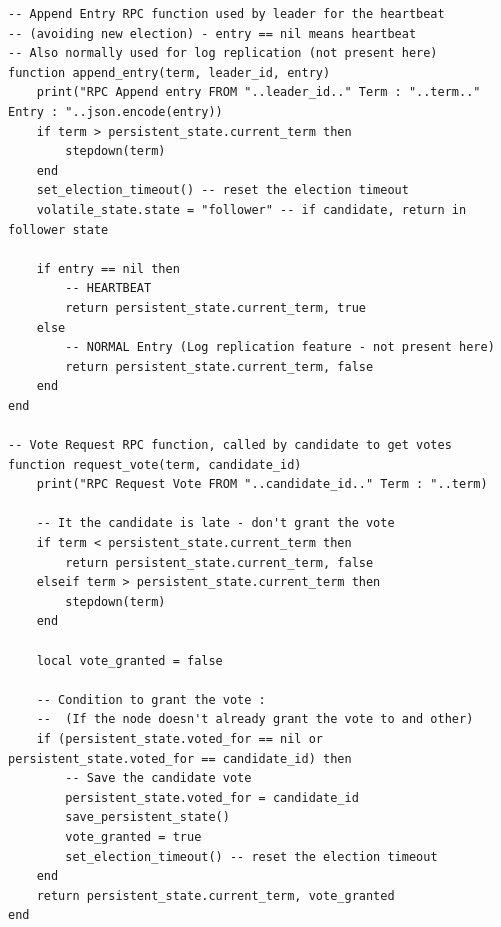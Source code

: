 \documentclass{eplmastersthesis}
\begin{document}
        \begin{minipage}{\linewidth}
        \begin{lstlisting}[style=MySmallLua,caption={RPC functions}]
-- Append Entry RPC function used by leader for the heartbeat
-- (avoiding new election) - entry == nil means heartbeat
-- Also normally used for log replication (not present here)
function append_entry(term, leader_id, entry)
    print("RPC Append entry FROM "..leader_id.." Term : "..term.." Entry : "..json.encode(entry))
    if term > persistent_state.current_term then
        stepdown(term)
    end
    set_election_timeout() -- reset the election timeout
    volatile_state.state = "follower" -- if candidate, return in follower state

    if entry == nil then
        -- HEARTBEAT
        return persistent_state.current_term, true
    else
        -- NORMAL Entry (Log replication feature - not present here)
        return persistent_state.current_term, false
    end
end

-- Vote Request RPC function, called by candidate to get votes
function request_vote(term, candidate_id)
    print("RPC Request Vote FROM "..candidate_id.." Term : "..term)

    -- It the candidate is late - don't grant the vote
    if term < persistent_state.current_term then
        return persistent_state.current_term, false
    elseif term > persistent_state.current_term then
        stepdown(term)
    end

    local vote_granted = false

    -- Condition to grant the vote :
    --  (If the node doesn't already grant the vote to and other)
    if (persistent_state.voted_for == nil or persistent_state.voted_for == candidate_id) then
        -- Save the candidate vote
        persistent_state.voted_for = candidate_id
        save_persistent_state()
        vote_granted = true
        set_election_timeout() -- reset the election timeout
    end
    return persistent_state.current_term, vote_granted
end
        \end{lstlisting}
        \end{minipage}
\end{document}
